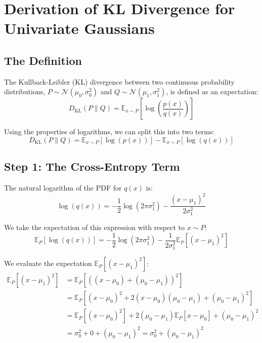 \section{Derivation of KL Divergence for Univariate Gaussians}
\label{app:kl_divergence}

\subsection{The Definition}

The Kullback-Leibler (KL) divergence between two continuous probability distributions, 
$P \sim \mathcal{N}(\mu_0, \sigma_0^2)$ and $Q \sim \mathcal{N}(\mu_1, \sigma_1^2)$, is defined as an expectation:
\begin{equation}
    D_{\text{KL}}(P \parallel Q) = \mathbb{E}_{x \sim P} \left[ \log\left(\frac{p(x)}{q(x)}\right) \right]
\end{equation}

Using the properties of logarithms, we can split this into two terms:
\begin{equation}
    D_{\text{KL}}(P \parallel Q) = \mathbb{E}_{x \sim P} \left[ \log(p(x)) \right] - \mathbb{E}_{x \sim P} \left[ \log(q(x)) \right]
    \label{eq:kl_split}
\end{equation}

\subsection{Step 1: The Cross-Entropy Term}

The natural logarithm of the PDF for $q(x)$ is:
\begin{equation}
    \log(q(x)) = -\frac{1}{2}\log(2\pi\sigma_1^2) - \frac{(x-\mu_1)^2}{2\sigma_1^2}
\end{equation}

We take the expectation of this expression with respect to $x \sim P$:
\begin{equation}
    \mathbb{E}_{P}\left[ \log(q(x)) \right] = -\frac{1}{2}\log(2\pi\sigma_1^2) - \frac{1}{2\sigma_1^2} \mathbb{E}_{P}\left[ (x-\mu_1)^2 \right]
\end{equation}

We evaluate the expectation $\mathbb{E}_{P}\left[ (x-\mu_1)^2 \right]$:
\begin{align*}
    \mathbb{E}_{P}\left[ (x-\mu_1)^2 \right] &= \mathbb{E}_{P}\left[ ((x-\mu_0) + (\mu_0-\mu_1))^2 \right] \\
    &= \mathbb{E}_{P}\left[ (x-\mu_0)^2 + 2(x-\mu_0)(\mu_0-\mu_1) + (\mu_0-\mu_1)^2 \right] \\
    &= \mathbb{E}_{P}[(x-\mu_0)^2] + 2(\mu_0-\mu_1)\mathbb{E}_{P}[x-\mu_0] + (\mu_0-\mu_1)^2 \\
    &= \sigma_0^2 + 0 + (\mu_0-\mu_1)^2 = \sigma_0^2 + (\mu_0-\mu_1)^2
\end{align*}


